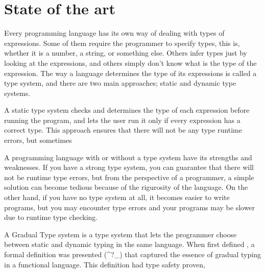 \chapter{State of the art}

Every programming language has its own way of dealing with types of expressions. Some of them require the programmer to specify types, this is, whether it is a number, a string, or something else. Others infer types just by looking at the expressions, and others simply don't know what is the type of the expression. The way a language determines the type of its expressions is called a type system, and there are two main approaches; static and dynamic type systems.

A static type system checks and determines the type of each expression before running the program, and lets the user run it only if every expression has a correct type. This approach ensures that there will not be any type runtime errors, but sometimes 

A programming language with or without a type system have its strengths and weaknesses. If you have a strong type system, you can guarantee that there will not be runtime type errors, but from the perspective of a programmer, a simple solution can become tedious because of the rigurosity of the language. On the other hand, if you have no type system at all, it becomes easier to write programs, but you may encounter type errors and your programs may be slower due to runtime type checking.

A Gradual Type system is a type system that lets the programmer choose between static and dynamic typing in the same language. When first defined \cite{Siek2006GradualTF}, a formal definition was presented (\lambda^{?}_{\rigtharrow}) that captured the essence of gradual typing in a functional language. This definition had type safety proven,
